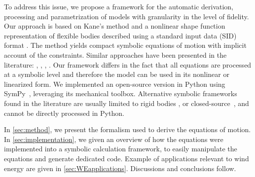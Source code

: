 \documentclass[wes, manuscript]{copernicus}
\begin{document}

To address this issue, we propose a framework for the automatic derivation, processing and
parametrization of models with granularity in the level of fidelity. Our approach is based on Kane’s method \citep{kane:1965} and a nonlinear shape function representation of flexible bodies \citep{shabana:book}
 described using a standard input data (SID) format \citep{Wallrapp:1994, Schwertassek:book}.
The method yields compact symbolic equations of motion with implicit account of the constraints. 
Similar approaches have been presented in the literature: \cite{Kurtz:2009}, \cite{Merz:2018}, \cite{Lemmer:2018}, \cite{branlard:2019flex}. Our framework differs in the fact that all equations are processed at a symbolic level and therefore the model can be used in its nonlinear or linearized form. 
We implemented an open-source version in Python using SymPy~\citep{sympy},  leveraging its mechanical toolbox.
Alternative symbolic frameworks found in the literature are usually limited to rigid bodies \citep{Verlinden:2005,Kurtz:2009,Gede:2013,Docquier:2013}, or closed-source~\citep{Autolev,NeweulM2,MotionGenesis}, and cannot be directly processed in Python. 




In \autoref{sec:method}, we present the formalism used to derive the equations of motion. 
    In \autoref{sec:implementation}, we given an overview of how the equations were implemented into a symbolic calculation framework, to easily manipulate the equations and generate dedicated code. 
Example of applications relevant to wind energy are given in \autoref{sec:WEapplications}. Discussions and conclusions follow.
\end{document}
